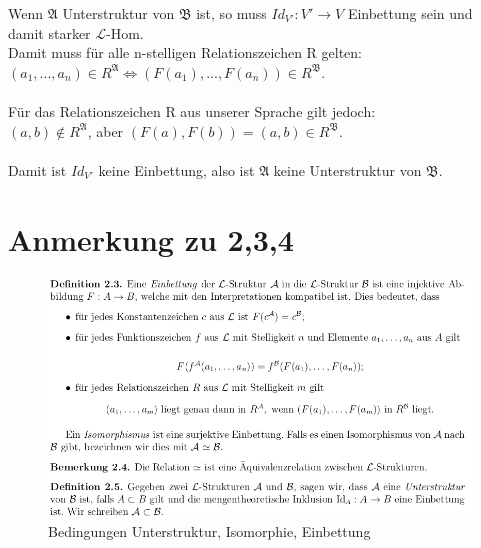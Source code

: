 \documentclass[a4paper]{scrartcl}
\begin{document}
\begin{itemize}
            Wenn $\mathfrak{A}$ Unterstruktur von $\mathfrak{B}$ ist, so muss $Id_{V'}: V' \rightarrow V$ Einbettung sein und damit starker $\mathscr{L}$-Hom.\\
            Damit muss für alle n-stelligen Relationszeichen R gelten:\\
            $(a_1,...,a_n) \in R^\mathfrak{A} \Leftrightarrow (F(a_1),...,F(a_n)) \in R^\mathfrak{B}$.\\

            \\Für das Relationszeichen R aus unserer Sprache gilt jedoch:\\
            $(a,b) \notin R^\mathfrak{A}$, aber $(F(a), F(b)) = (a, b) \in R^\mathfrak{B}$.\\
            
            \\Damit ist $Id_{V'}$ keine Einbettung, also ist $\mathfrak{A}$ keine Unterstruktur von $\mathfrak{B}$.
        
    \end{itemize}

\section*{Anmerkung zu 2,3,4}%
\label{sec:anmerkung_zu_2,3,4}

    \begin{figure}[H]
        \centering
        \includegraphics[scale=0.6]{./Unterstruktur.png}
        \caption{Bedingungen Unterstruktur, Isomorphie, Einbettung}
        \label{fig:}
    \end{figure}
\end{document}
